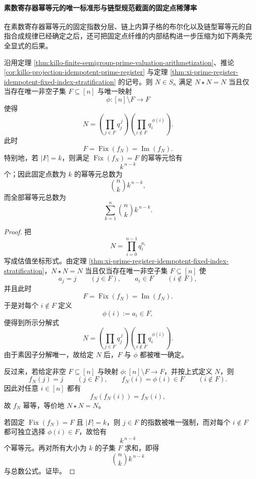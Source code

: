 \paragraph{素数寄存器幂等元的唯一标准形与链型规范截面的固定点稀薄率}
在素数寄存器幂等元的固定指数分层、链上内算子格的布尔化以及链型幂等元的自指合成规律已经确定之后，还可把固定点纤维的内部结构进一步压缩为如下两条完全显式的后果。

\begin{theorem}[素数寄存器幂等元的唯一标准形与固定点纤维计数]\label{thm:xi-prime-register-idempotent-unique-normal-form}
沿用定理 \ref{thm:killo-finite-semigroup-prime-valuation-arithmetization}、推论 \ref{cor:killo-projection-idempotent-prime-register} 与定理 \ref{thm:xi-prime-register-idempotent-fixed-index-stratification} 的记号。则 \(N\in S_n\) 满足 \(N\star N=N\) 当且仅当存在唯一非空子集 \(F\subseteq[n]\) 与唯一映射
\[
\phi:[n]\setminus F\to F
\]
使得
\[
N=
\left(\prod_{j\in F}q_j^{\,j}\right)
\left(\prod_{i\notin F}q_i^{\,\phi(i)}\right).
\]
此时
\[
F=\operatorname{Fix}(f_N)=\operatorname{Im}(f_N).
\]
特别地，若 \(|F|=k\)，则满足 \(\operatorname{Fix}(f_N)=F\) 的幂等元恰有
\[
k^{\,n-k}
\]
个；因此固定点数为 \(k\) 的幂等元总数为
\[
\binom{n}{k}k^{\,n-k},
\]
而全部幂等元总数为
\[
\sum_{k=1}^{n}\binom{n}{k}k^{\,n-k}.
\]
\end{theorem}
\begin{proof}
把
\[
N=\prod_{i=0}^{n-1}q_i^{a_i}
\]
写成估值坐标形式。由定理 \ref{thm:xi-prime-register-idempotent-fixed-index-stratification}，\(N\star N=N\) 当且仅当存在唯一非空子集 \(F\subseteq[n]\) 使
\[
a_j=j\qquad (j\in F),
\qquad
a_i\in F\qquad (i\notin F),
\]
并且此时
\[
F=\operatorname{Fix}(f_N)=\operatorname{Im}(f_N).
\]
于是对每个 \(i\notin F\) 定义
\[
\phi(i):=a_i\in F,
\]
便得到所示分解式
\[
N=
\left(\prod_{j\in F}q_j^{\,j}\right)
\left(\prod_{i\notin F}q_i^{\,\phi(i)}\right).
\]
由于素因子分解唯一，故给定 \(N\) 后，\(F\) 与 \(\phi\) 都被唯一确定。

反过来，若给定非空 \(F\subseteq[n]\) 与映射 \(\phi:[n]\setminus F\to F\)，并按上式定义 \(N\)，则
\[
f_N(j)=j\qquad (j\in F),
\qquad
f_N(i)=\phi(i)\in F\qquad (i\notin F).
\]
因此对任意 \(i\in[n]\) 都有
\[
f_N(f_N(i))=f_N(i),
\]
故 \(f_N\) 幂等，等价地 \(N\star N=N\)。

若固定 \(\operatorname{Fix}(f_N)=F\) 且 \(|F|=k\)，则 \(j\in F\) 的指数被唯一强制，而对每个 \(i\notin F\) 都可独立选择 \(\phi(i)\in F\)，故恰有
\[
k^{\,n-k}
\]
个幂等元。再对所有大小为 \(k\) 的子集 \(F\) 求和，即得
\[
\binom{n}{k}k^{\,n-k}
\]
与总数公式。证毕。
\end{proof}

